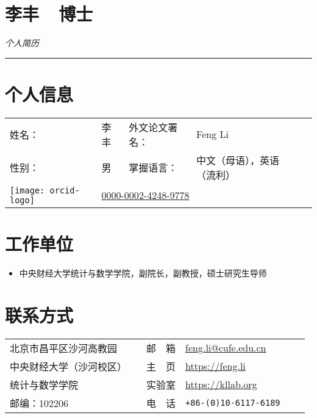 \documentclass[twoside,a4paper,10pt]{amsart}
\begin{document}
\thispagestyle{plain}
\section*{\Huge{李丰~~博士}}
\begin{center}
  \emph{\huge 个人简历}
\end{center}
\rule{\textwidth}{.01cm}

\section*{个人信息}
\begin{tabular}{l p{4cm} l  l l}
  姓名：   & 李丰 & 外文论文署名： & Feng Li                                 \\
  性别：   & 男   & 掌握语言：     & 中文（母语），英语（流利）              \\
  \texttt{[image: orcid-logo]}   & \multicolumn{3}{l}{\href{https://orcid.org/0000-0002-4248-9778}{0000-0002-4248-9778}} \\
\end{tabular}

\section*{工作单位}

\begin{itemize}
\item [] 中央财经大学统计与数学学院，副院长，副教授，硕士研究生导师
\end{itemize}

\section*{联系方式}

\begin{tabular}{ l l |  l  l l l}
  北京市昌平区沙河高教园   &  & 邮　箱 & \href{mailto:feng.li@cufe.edu.cn}{\url{feng.li@cufe.edu.cn}} \\
  中央财经大学（沙河校区） &  & 主　页 & \url{https://feng.li}                                        \\
  统计与数学学院           &  & 实验室 & \url{https://kllab.org}                                      \\
  邮编：102206             &  & 电　话 & \texttt{+86-(0)10-6117-6189}                                 \\
\end{tabular}
\end{document}
